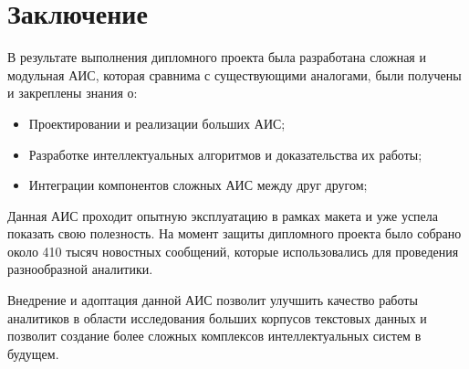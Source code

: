 \section*{Заключение}

В результате выполнения дипломного проекта была разработана сложная и модульная АИС, которая сравнима с существующими аналогами, были получены и закреплены знания о:
\begin{itemize}
\item Проектировании и реализации больших АИС;
\item Разработке интеллектуальных алгоритмов и доказательства их работы;
\item Интеграции компонентов сложных АИС между друг другом;
\end{itemize}

Данная АИС проходит опытную эксплуатацию в рамках макета и уже успела показать свою полезность. На момент защиты дипломного проекта было собрано около 410 тысяч новостных сообщений, которые использовались для проведения разнообразной аналитики.

Внедрение и адоптация данной АИС позволит улучшить качество работы аналитиков в области исследования больших корпусов текстовых данных и позволит создание более сложных комплексов интеллектуальных систем в будущем.